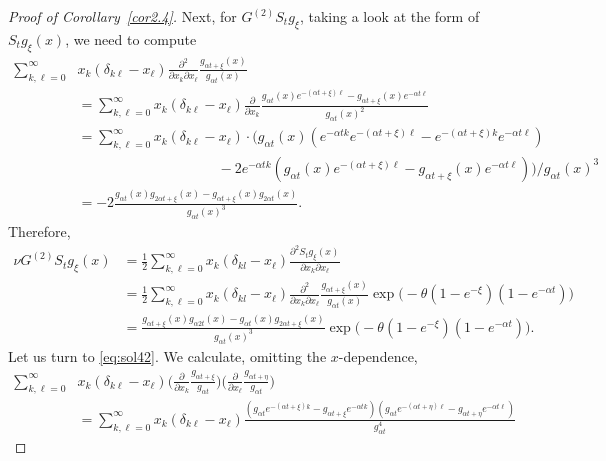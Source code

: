 \documentclass{imsart}
\theoremstyle{plain}
\theoremstyle{definition}
\begin{document}
\begin{proof}[Proof of Corollary~\ref{cor2.4}]
Next, for $G^{(2)}S_t g_{\xi}$, taking a look at the form of $S_tg_{\xi}(x)$, we need to compute
\begin{align*}
  \sum_{k,\ell=0}^\infty & 
  x_k(\delta_{k\ell} - x_\ell) \frac{\partial^2}{\partial x_k
    \partial x_\ell} \frac{g_{\alpha t + \xi}(x)}{g_{\alpha t}(x)} 
  \\
  & = \sum_{k,\ell=0}^\infty
  x_k(\delta_{k\ell} - x_\ell) \frac{\partial}{\partial x_k} \frac{g_{\alpha t}(x) e^{-(\alpha t + \xi)\ell} - g_{\alpha t + \xi}(x) e^{-\alpha t \ell}}{g_{\alpha t}(x)^2} 
  \\ & = \sum_{k,\ell=0}^\infty
  x_k(\delta_{k\ell} - x_\ell) \cdot \big(g_{\alpha t}(x) ( e^{-\alpha t k} e^{-(\alpha t + \xi)\ell} - e^{-(\alpha t + \xi) k} e^{-\alpha t \ell}) \\ & \qquad \qquad \qquad \qquad \qquad - 2 e^{-\alpha tk}(g_{\alpha t}(x) e^{-(\alpha t + \xi)\ell} - g_{\alpha t + \xi}(x) e^{-\alpha t \ell})\big) / g_{\alpha t}(x)^3
  \\ & =  
  -2\frac{g_{\alpha t}(x)g_{2\alpha t+\xi}(x) - g_{\alpha t +\xi}(x)g_{2\alpha t}(x)}{g_{\alpha t}(x)^3}.
\end{align*}
Therefore, 
\begin{align*}
    \nu G^{(2)} S_{t} g_{ \xi}(x) & = \frac{1}{2} \sum_{k,\ell = 0}^\infty x_k ( \delta_{kl} - x_\ell) \frac{\partial^2 S_{t} g_{ \xi} (x)}{\partial x_k \partial x_\ell} \\ & = 
    \frac{1}{2} \sum_{k,\ell = 0}^\infty x_k ( \delta_{kl} - x_\ell) \frac{\partial^2 }{\partial x_k \partial x_\ell} \frac{g_{\alpha t +\xi}(x)}{g_{\alpha t}(x)}
    \exp\Big(-\theta(1-e^{-\xi})(1-e^{-\alpha t})\Big) \\ & = 
    \frac{g_{\alpha t + \xi}(x)g_{\alpha 2t}(x) - g_{\alpha t}(x) g_{2\alpha t+\xi}(x)}{g_{\alpha t}(x)^3}\exp\Big(-\theta(1-e^{- \xi})(1-e^{-\alpha t})\Big).
\end{align*}
Let us turn to \eqref{eq:sol42}. We calculate, omitting the $x$-dependence,
\begin{align*}
  \sum_{k,\ell=0}^\infty & 
  x_k(\delta_{k\ell} - x_\ell) \Big(\frac{\partial}{\partial x_k}\frac{g_{\alpha  t + \xi}}{g_{\alpha t}} \Big) \Big(\frac{\partial}{\partial x_\ell} \frac{g_{\alpha t + \eta}}{g_{\alpha t}}\Big)
  \\
  & = \sum_{k,\ell=0}^\infty
  x_k(\delta_{k\ell} - x_\ell) \frac{(g_{\alpha t} e^{-(\alpha t + \xi)k} - g_{\alpha t + \xi} e^{-\alpha t k})(g_{\alpha t} e^{-(\alpha t + \eta)\ell} - g_{\alpha t + \eta} e^{-\alpha t \ell})}{g_{\alpha t}^4} 

\end{align*}
\end{proof}
\end{document}
